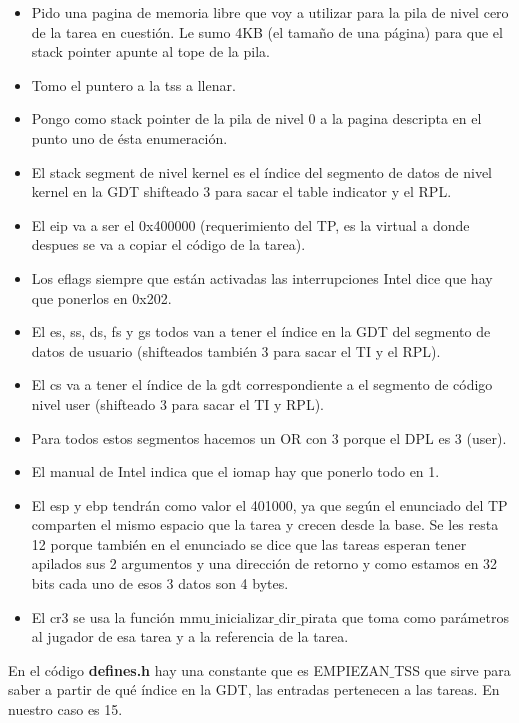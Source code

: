 \begin{itemize}

\item Pido una pagina de memoria libre que voy a utilizar para la pila de nivel cero de la tarea en cuestión. Le sumo 4KB (el tamaño de una página) para que el stack pointer apunte al tope de la pila.
\item Tomo el puntero a la tss a llenar.
\item Pongo como stack pointer de la pila de nivel 0 a la pagina descripta en el punto uno de ésta enumeración.
\item El stack segment de nivel kernel es el índice del segmento de datos de nivel kernel en la GDT shifteado 3 para sacar el table indicator y el RPL.
\item El eip va a ser el 0x400000 (requerimiento del TP, es la virtual a donde despues se va a copiar el código de la tarea).
\item Los eflags siempre que están activadas las interrupciones Intel dice que hay que ponerlos en 0x202.
\item El es, ss, ds, fs y gs todos van a tener el índice en la GDT del segmento de datos de usuario (shifteados también 3 para sacar el TI y el RPL).
\item El cs va a tener el índice de la gdt correspondiente a el segmento de código nivel user (shifteado 3 para sacar el TI y RPL).
\item Para todos estos segmentos hacemos un OR con 3 porque el DPL es 3 (user).
\item El manual de Intel indica que el iomap hay que ponerlo todo en 1.
\item El esp y ebp tendrán como valor el 401000, ya que según el enunciado del TP comparten el mismo espacio que la tarea y crecen desde la base. Se les resta 12 porque también en el enunciado se dice que las tareas esperan tener apilados sus 2 argumentos y una dirección de retorno y como estamos en 32 bits cada uno de esos 3 datos son 4 bytes.
\item El cr3 se usa la función mmu$\_$inicializar$\_$dir$\_$pirata que toma como parámetros al jugador de esa tarea y a la referencia de la tarea.
 
\end{itemize}

En el código \textbf{defines.h} hay una constante que es EMPIEZAN$\_$TSS que sirve para saber a partir de qué índice en la GDT, las entradas pertenecen a las tareas. En nuestro caso es 15.

